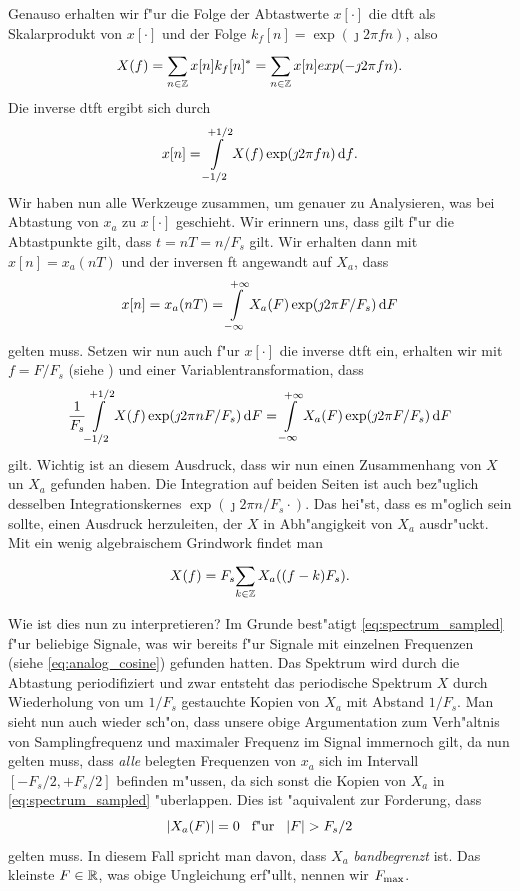 Genauso erhalten wir f"ur die Folge der Abtastwerte $x[\cdot]$ die \gls{dtft} als Skalarprodukt von $x[\cdot]$ und der Folge $k_f[n] = \exp(\jmath 2 \pi f n)$, also
%
\begin{equation}\label{eq:dtft_inner_prod}
    X(f) = {\sum\limits_{n \in \mathbb{Z}}^{}{
            x[n] k_f[n]^\ast
        }}
        = {\sum\limits_{n \in \mathbb{Z}}^{}{
            x[n] exp(-\jmath 2 \pi f n)
        }}.
\end{equation}
%
Die inverse \gls{dtft} ergibt sich durch
\[
x[n] = {\int\limits_{-1/2}^{+1/2}{X(f) \exp(\jmath 2 \pi f n)}\,\mathrm{d}{f}}.
\]
Wir haben nun alle Werkzeuge zusammen, um genauer zu Analysieren, was bei Abtastung von $x_a$ zu $x[\cdot]$ geschieht.
Wir erinnern uns, dass gilt f"ur die Abtastpunkte gilt, dass $t = nT = n/F_s$ gilt.
Wir erhalten dann mit $x[n] = x_a(nT)$ und der inversen \gls{ft} angewandt auf $X_a$, dass
\[
x[n] = x_a(nT) = {\int\limits_{-\infty}^{+\infty}{X_a(F) \exp(\jmath 2 \pi F/F_s)}\,\mathrm{d}{F}}
\]
gelten muss.
Setzen wir nun auch f"ur $x[\cdot]$ die inverse \gls{dtft} ein, erhalten wir mit $f = F/F_s$ (siehe ) und einer Variablentransformation, dass
\[
    \frac{1}{F_s} {\int\limits_{-1/2}^{+1/2}{X(f) \exp(\jmath 2 \pi n F/F_s)}\,\mathrm{d}{F}}
    = {\int\limits_{-\infty}^{+\infty}{X_a(F) \exp(\jmath 2 \pi F/F_s)}\,\mathrm{d}{F}}
\]
gilt. 
Wichtig ist an diesem Ausdruck, dass wir nun einen Zusammenhang von $X$ un $X_a$ gefunden haben.
Die Integration auf beiden Seiten ist auch bez"uglich desselben Integrationskernes $\exp(\jmath 2 \pi n/F_s \cdot)$.
Das hei"st, dass es m"oglich sein sollte, einen Ausdruck herzuleiten, der $X$ in Abh"angigkeit von $X_a$ ausdr"uckt.
Mit ein wenig algebraischem Grindwork findet man
\begin{equation}\label{eq:spectrum_sampled}
    X(f) = F_s {\sum\limits_{k \in \mathbb{Z}}^{}{
        X_a((f - k) F_s)
    }}.
\end{equation}

Wie ist dies nun zu interpretieren? 
Im Grunde best"atigt \eqref{eq:spectrum_sampled} f"ur beliebige Signale, was wir bereits f"ur Signale mit einzelnen Frequenzen (siehe \eqref{eq:analog_cosine}) gefunden hatten.
Das Spektrum wird durch die Abtastung periodifiziert und zwar entsteht das periodische Spektrum $X$ durch Wiederholung von um $1/F_s$ gestauchte Kopien von $X_a$ mit Abstand $1/F_s$.
Man sieht nun auch wieder sch"on, dass unsere obige Argumentation zum Verh"altnis von Samplingfrequenz und maximaler Frequenz im Signal immernoch gilt, da nun gelten muss, dass \emph{alle} belegten Frequenzen von $x_a$ sich im Intervall $[-F_s/2,+F_s/2]$ befinden m"ussen, da sich sonst die Kopien von $X_a$ in \eqref{eq:spectrum_sampled} "uberlappen.
Dies ist "aquivalent zur Forderung, dass
\[
{\left| X_a(F) \right|} = 0 {\hspace{3mm} \text{f"ur} \hspace{3mm}} {\left| F \right|} > F_s/2
\]
gelten muss. 
In diesem Fall spricht man davon, dass $X_a$ \emph{bandbegrenzt} ist.
Das kleinste $F \in \mathbb{R}$, was obige Ungleichung erf"ullt, nennen wir $F_{\rm max}$.

